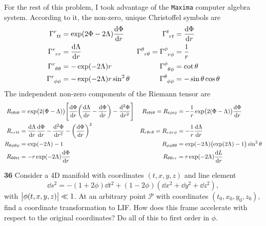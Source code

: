 \documentclass[gr-notes.tex]{subfiles}
\begin{document}
For the rest of this problem, I took advantage of the \texttt{Maxima} computer algebra system. According to it, the non-zero, unique Christoffel symbols are
%
\begin{align*}
  \tensor{\Gamma}{^r_{tt}} &=
  \exp(2\Phi - 2\Lambda) \dv{\Phi}{r}
  &
  \tensor{\Gamma}{^t_{rt}} &=
  \dv{\Phi}{r}
  \\
  \tensor{\Gamma}{^r_{rr}} &=
  \dv{\Lambda}{r}
  &
  \tensor{\Gamma}{^\theta_{r \theta}} =
  \tensor{\Gamma}{^\phi_{r \phi}} &=
  \frac{1}{r}
  \\
  \tensor{\Gamma}{^r_{\theta\theta}} &=
  -\exp(-2 \Lambda) r
  &
  \tensor{\Gamma}{^\phi_{\theta\phi}} &=
  \cot\theta
  \\
  \tensor{\Gamma}{^r_{\phi\phi}} &=
  -\exp(-2 \Lambda) r \sin^2\theta
  &
  \tensor{\Gamma}{^\theta_{\phi\phi}} &=
  -\sin\theta \cos\theta
\end{align*}
%
The independent non-zero components of the Riemann tensor are
%
\begin{align*}
  R_{t \theta t \theta} &=
  \exp(2(\Phi-\Lambda)) \qty[
    \dv{\Phi}{r} \qty(\dv{\Lambda}{r} - \dv{\Phi}{r}) - \dv[2]{\Phi}{r}
  ]
  &
  R_{t \theta t \theta} = R_{t \phi t \phi} &=
  -\frac{1}{r} \exp(2(\Phi - \Lambda)) \dv{\Phi}{r}
  \\
  R_{r r t t} &=
  \dv{\Lambda}{r} \dv{\Phi}{r} -
  \dv[2]{\Phi}{r} -
  \qty(\dv{\Phi}{r})^2
  &
  R_{r \theta r \theta} = R_{r \phi r \phi} &=
  -\frac{1}{r} \dv{\Lambda}{r}
  \\
  R_{\theta \phi \theta \phi} &=
  \exp(-2\Lambda) - 1
  &
  R_{\phi \phi \theta \theta} &=
  \exp(-2\Lambda) \qty(\exp(2 \Lambda) - 1) \sin^2\theta
  \\
  R_{\theta \theta t t} &=
  -r \exp(-2 \Lambda) \dv{\Phi}{r}
  &
  R_{\theta \theta r r} &=
  r \exp(-2 \Lambda) \dv{L}{r}
\end{align*}

\textbf{36}
Consider a 4D manifold with coordinates $(t,x,y,z)$ and line element
%
\begin{displaymath}
  \dd{s}^2 =
 -(1 + 2\phi) \dd{t}^2 +
  (1 - 2\phi) (\dd{x}^2 + \dd{y}^2 + \dd{z}^2),
\end{displaymath}
%
with $\abs{\phi(t,x,y,z)} \ll 1$. At an arbitrary point $\mathcal{P}$ with coordinates $(t_0,x_0,y_0,z_0)$, find a coordinate transformation to LIF. How does this frame accelerate with respect to the original coordinates? Do all of this to first order in $\phi$.
\end{document}
